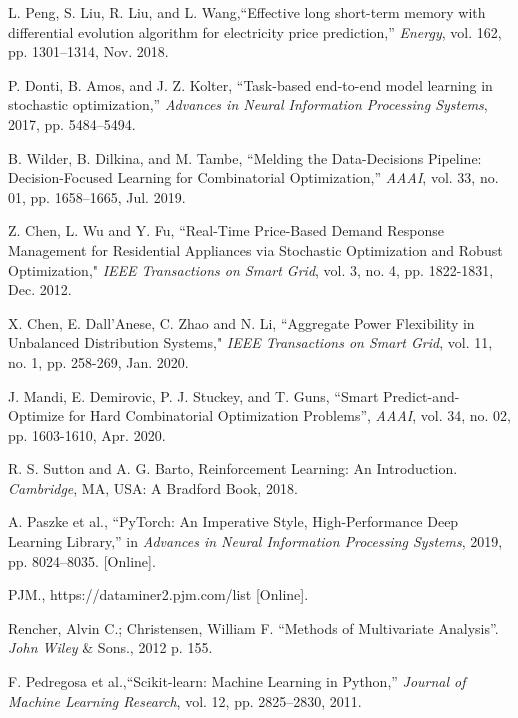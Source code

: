 \documentclass[journal]{IEEEtran}
\begin{document}
\begin{thebibliography}{2}
L. Peng, S. Liu, R. Liu, and L. Wang,``Effective long short-term memory with differential evolution algorithm for electricity price prediction,” \emph{Energy}, vol. 162, pp. 1301–1314, Nov. 2018.

P. Donti, B. Amos, and J. Z. Kolter, “Task-based end-to-end model learning in stochastic optimization,” \emph{Advances in Neural Information Processing Systems}, 2017, pp. 5484–5494.

B. Wilder, B. Dilkina, and M. Tambe, “Melding the Data-Decisions Pipeline: Decision-Focused Learning for Combinatorial Optimization,” \emph{AAAI}, vol. 33, no. 01, pp. 1658–1665, Jul. 2019.

Z. Chen, L. Wu and Y. Fu, “Real-Time Price-Based Demand Response Management for Residential Appliances via Stochastic Optimization and Robust Optimization," \emph{IEEE Transactions on Smart Grid}, vol. 3, no. 4, pp. 1822-1831, Dec. 2012.

X. Chen, E. Dall’Anese, C. Zhao and N. Li, “Aggregate Power Flexibility in Unbalanced Distribution Systems," \emph{IEEE Transactions on Smart Grid}, vol. 11, no. 1, pp. 258-269, Jan. 2020.

J. Mandi, E. Demirovic, P. J. Stuckey, and T. Guns, “Smart Predict-and-Optimize for Hard Combinatorial Optimization Problems”, \emph{AAAI}, vol. 34, no. 02, pp. 1603-1610, Apr. 2020.

R. S. Sutton and A. G. Barto, Reinforcement Learning: An Introduction. \emph{Cambridge}, MA, USA: A Bradford Book, 2018.


A. Paszke et al., “PyTorch: An Imperative Style, High-Performance Deep Learning Library,” in \emph{Advances in Neural Information Processing Systems}, 2019, pp. 8024–8035. [Online].

PJM., https://dataminer2.pjm.com/list [Online].

Rencher, Alvin C.; Christensen, William F. ``Methods of Multivariate Analysis''. \emph{John Wiley} \& Sons., 2012 p. 155.

F. Pedregosa et al.,``Scikit-learn: Machine Learning in Python,” \emph{Journal of Machine Learning Research}, vol. 12, pp. 2825–2830, 2011.



\end{thebibliography}
\end{document}
